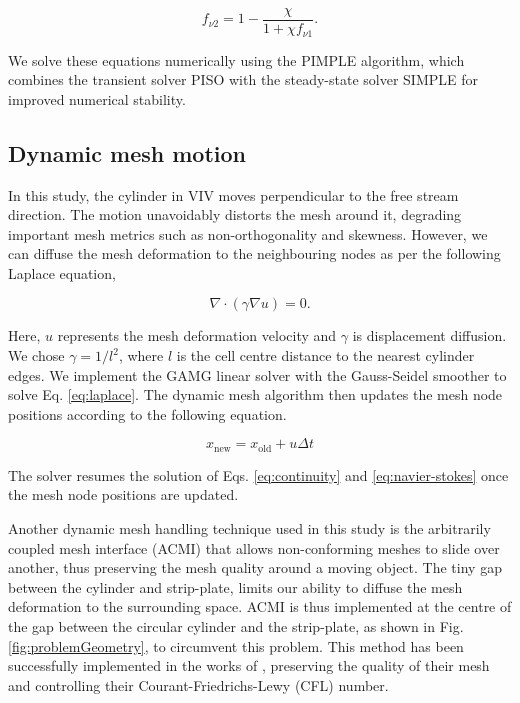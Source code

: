 \documentclass[a4paper,fleqn]{cas-sc}
\begin{document}
\begin{equation}
  f_{\nu 2} = 1 - \frac{\chi}{1 + \chi f_{\nu 1}}.
  \label{eq:fv2}
\end{equation}

\noindent We solve these equations numerically using the PIMPLE algorithm, which combines the transient solver PISO with the steady-state solver SIMPLE for improved numerical stability.

\subsection{Dynamic mesh motion} \label{ssec:dynMesh}

In this study, the cylinder in VIV moves perpendicular to the free stream direction. The motion unavoidably distorts the mesh around it, degrading important mesh metrics such as non-orthogonality and skewness. However, we can diffuse the mesh deformation to the neighbouring nodes as per the following Laplace equation,

\begin{equation}
  \nabla \cdot \left( \gamma \nabla u \right) = 0.
  \label{eq:laplace}
\end{equation}

\noindent Here, $u$ represents the mesh deformation velocity and $\gamma$ is displacement diffusion. We chose $\gamma = 1/l^{2}$, where $l$ is the cell centre distance to the nearest cylinder edges. We implement the GAMG linear solver with the Gauss-Seidel smoother to solve Eq. \ref{eq:laplace}. The dynamic mesh algorithm then updates the mesh node positions according to the following equation.

\begin{equation}
  x_{\text{new}} = x_{\text{old}} + u \Delta t
  \label{eq:meshNodeUpdate}
\end{equation}

\noindent The solver resumes the solution of Eqs. \ref{eq:continuity} and \ref{eq:navier-stokes} once the mesh node positions are updated.

Another dynamic mesh handling technique used in this study is the arbitrarily coupled mesh interface (ACMI) that allows non-conforming meshes to slide over another, thus preserving the mesh quality around a moving object. The tiny gap between the cylinder and strip-plate, limits our ability to diffuse the mesh deformation to the surrounding space. ACMI is thus implemented at the centre of the gap between the circular cylinder and the strip-plate, as shown in Fig. \ref{fig:problemGeometry}, to circumvent this problem. This method has been successfully implemented in the works of \citet{Ding2015b,Zhang2018}, preserving the quality of their mesh and controlling their Courant-Friedrichs-Lewy (CFL) number.
\end{document}

